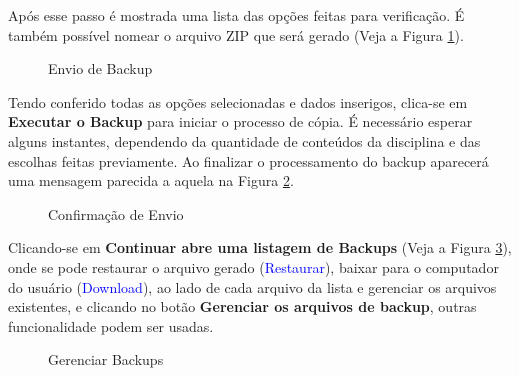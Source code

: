 Após esse passo é mostrada uma lista das opções feitas para verificação. É também possível nomear o arquivo ZIP que será gerado (Veja a Figura \ref{Fig: envioBackup}).

\begin{figure}[htbp]
 \begin{center}
  \caption{Envio de Backup}
  \label{Fig: envioBackup}
 \end{center}
\end{figure}

Tendo conferido todas as opções selecionadas e dados inserigos, clica-se em \textbf{Executar o Backup} para iniciar o processo de cópia. É necessário esperar alguns instantes, dependendo da quantidade de conteúdos da disciplina e das escolhas feitas previamente. Ao finalizar o processamento do backup aparecerá uma mensagem parecida a aquela na Figura \ref{Fig: confEnvio}.

\begin{figure}[htbp]
 \begin{center}
  \caption{Confirmação de Envio}
  \label{Fig: confEnvio}
 \end{center}
\end{figure}
Clicando-se em \textbf{Continuar abre uma listagem de Backups} (Veja a Figura \ref{Fig: genrecBackup}), onde se pode restaurar o arquivo gerado (\textcolor{blue}{Restaurar}), baixar para o computador do usuário (\textcolor{blue}{Download}), ao lado de cada arquivo da lista e gerenciar os arquivos existentes, e clicando no botão \textbf{Gerenciar os arquivos de backup}, outras funcionalidade podem ser usadas.
\begin{figure}[htbp]
 \begin{center}
  \caption{Gerenciar Backups}
  \label{Fig: genrecBackup}
 \end{center}
\end{figure}

